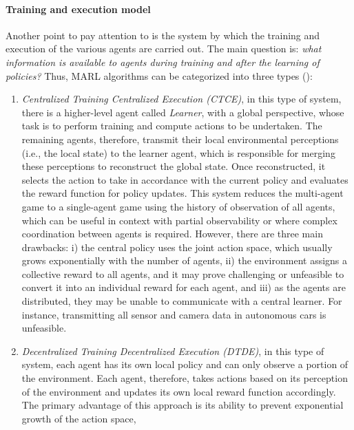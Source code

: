 \documentclass[12pt,a4paper,openright,twoside]{book}
\begin{document}
\paragraph{Training and execution model}
   
Another point to pay attention to is the system by which the training and execution of the various agents are carried out. 
    The main question is: \emph{what information is available to agents during training and after the 
    learning of policies?}
    Thus, MARL algorithms can be categorized into three types ():
    \begin{enumerate}
        \item \emph{Centralized Training Centralized Execution (CTCE)}, in this type of system, there is a higher-level agent called 
            \emph{Learner}, with a global perspective, whose task is to perform training and compute actions to be undertaken. 
            The remaining agents, therefore, transmit their local environmental perceptions (i.e., the local state) to the learner agent, 
            which is responsible for merging these perceptions to reconstruct the global state. Once reconstructed, it selects the action to take 
            in accordance with the current policy and evaluates the reward function for policy updates.
            This system reduces the multi-agent game to a single-agent game using the history of observation of all agents, which can be useful 
            in context with partial observability or where complex coordination between agents is required. 
            However, there are three main drawbacks:
            i) the central policy uses the joint action space, which usually grows exponentially with the number of agents,
            ii) the environment assigns a collective reward to all agents, and it may prove challenging or  unfeasible to convert 
                it into an individual reward for each agent, and
            iii) as the agents are distributed, they may be unable to communicate with a central learner. 
                For instance, transmitting all sensor and camera data in autonomous cars is unfeasible.
        \item \emph{Decentralized Training Decentralized Execution (DTDE)}, in this type of system, each agent has its own local policy 
            and can only observe a portion of the environment. Each agent, therefore, takes actions based on its perception of the environment 
            and updates its own local reward function accordingly.
            The primary advantage of this approach is its ability to prevent exponential growth of the action space, 

\end{enumerate}
\end{document}
